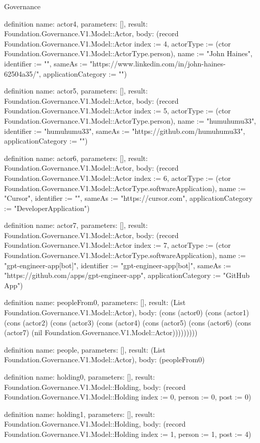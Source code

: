 \begin{lexlean}{Governance}
\begin{semanticmodule}
definition{
  name: actor4,
  parameters: [],
  result: Foundation.Governance.V1.Model::Actor,
  body: (record Foundation.Governance.V1.Model::Actor {index := 4, actorType := (ctor Foundation.Governance.V1.Model::ActorType.person), name := "John Haines", identifier := "", sameAs := "https://www.linkedin.com/in/john-haines-62504a35/", applicationCategory := ""})
}

definition{
  name: actor5,
  parameters: [],
  result: Foundation.Governance.V1.Model::Actor,
  body: (record Foundation.Governance.V1.Model::Actor {index := 5, actorType := (ctor Foundation.Governance.V1.Model::ActorType.person), name := "humuhumu33", identifier := "humuhumu33", sameAs := "https://github.com/humuhumu33", applicationCategory := ""})
}

definition{
  name: actor6,
  parameters: [],
  result: Foundation.Governance.V1.Model::Actor,
  body: (record Foundation.Governance.V1.Model::Actor {index := 6, actorType := (ctor Foundation.Governance.V1.Model::ActorType.softwareApplication), name := "Cursor", identifier := "", sameAs := "https://cursor.com", applicationCategory := "DeveloperApplication"})
}

definition{
  name: actor7,
  parameters: [],
  result: Foundation.Governance.V1.Model::Actor,
  body: (record Foundation.Governance.V1.Model::Actor {index := 7, actorType := (ctor Foundation.Governance.V1.Model::ActorType.softwareApplication), name := "gpt-engineer-app[bot]", identifier := "gpt-engineer-app[bot]", sameAs := "https://github.com/apps/gpt-engineer-app", applicationCategory := "GitHub App"})
}

definition{
  name: peopleFrom0,
  parameters: [],
  result: (List Foundation.Governance.V1.Model::Actor),
  body: (cons (actor0) (cons (actor1) (cons (actor2) (cons (actor3) (cons (actor4) (cons (actor5) (cons (actor6) (cons (actor7) (nil Foundation.Governance.V1.Model::Actor)))))))))
}

definition{
  name: people,
  parameters: [],
  result: (List Foundation.Governance.V1.Model::Actor),
  body: (peopleFrom0)
}

definition{
  name: holding0,
  parameters: [],
  result: Foundation.Governance.V1.Model::Holding,
  body: (record Foundation.Governance.V1.Model::Holding {index := 0, person := 0, post := 0})
}

definition{
  name: holding1,
  parameters: [],
  result: Foundation.Governance.V1.Model::Holding,
  body: (record Foundation.Governance.V1.Model::Holding {index := 1, person := 1, post := 4})
}


\end{semanticmodule}
\end{lexlean}

